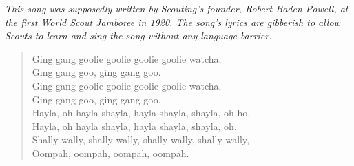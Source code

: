 
\textit{This song was supposedly written by Scouting's founder, Robert Baden-Powell, at the first World Scout Jamboree in 1920. The song's lyrics are gibberish to allow Scouts to learn and sing the song without any language barrier.}

\begin{verse}
Ging gang goolie goolie goolie goolie watcha, \\

Ging gang goo, ging gang goo. \\

Ging gang goolie goolie goolie goolie watcha, \\

Ging gang goo, ging gang goo. \\

Hayla, oh hayla shayla, hayla shayla, shayla, oh-ho, \\

Hayla, oh hayla shayla, hayla shayla, shayla, oh. \\

Shally wally, shally wally, shally wally, shally wally, \\

Oompah, oompah, oompah, oompah. \\
\end{verse}
